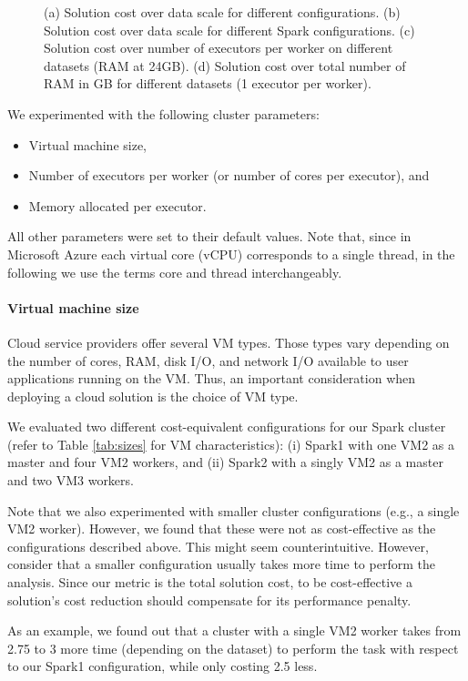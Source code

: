 {\begin{figure}[t!]
{  }
\caption{(a) Solution cost over data scale for different \sti{} configurations. (b) Solution cost over data scale for different Spark configurations. (c) Solution cost over number of executors per worker on different datasets (RAM at 24GB). (d) Solution cost over total number of RAM in GB for different datasets (1 executor per worker).}
\label{fig:tuning}
\end{figure}

We experimented with the following cluster parameters:
  \begin{itemize}
      \item Virtual machine size,
        \item Number of executors per worker (or number of cores per executor), and
        \item Memory allocated per executor.
  \end{itemize}
All other parameters were set to their default values. Note that, since in Microsoft Azure each virtual core (vCPU) corresponds to a single thread, in the following we use the terms core and thread interchangeably.

\paragraph{Virtual machine size} Cloud service providers offer several VM types. Those types vary depending on the number of cores, RAM, disk I/O, and network I/O available to user applications running on the VM. Thus, an important consideration when deploying a cloud solution is the choice of VM type.

We evaluated two different cost-equivalent configurations for our Spark cluster (refer to Table \ref{tab:sizes} for VM characteristics): (i) Spark1 with one VM2 as a master and four VM2 workers, and (ii) Spark2 with a singly VM2 as a master and two VM3 workers.

Note that we also experimented with smaller cluster configurations (e.g., a single VM2 worker). However, we found that these were not as cost-effective as the configurations described above. This might seem counterintuitive. However, consider that a smaller configuration usually takes more time to perform the analysis. Since our metric is the total solution cost, to be cost-effective a solution's cost reduction should compensate for its performance penalty.

As an example, we found out that a cluster with a single VM2 worker takes from 2.75 to 3 more time (depending on the dataset) to perform the task with respect to our Spark1 configuration, while only costing 2.5 less.

}
